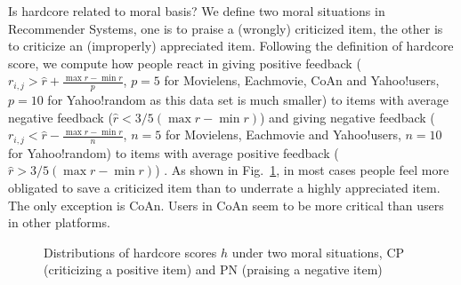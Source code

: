 \documentclass[sigconf]{acmart}
\begin{document}
Is hardcore related to moral basis? We define two moral situations in Recommender Systems, one is to praise a (wrongly) criticized item, the other is to criticize an (improperly) appreciated item. Following the definition of hardcore score, we compute how people react in giving positive feedback ($r_{i,j}>\hat{r}+\frac{\max{r}-\min{r}}{p}$, $p=5$ for Movielens, Eachmovie, CoAn and Yahoo!users, $p=10$ for Yahoo!random as this data set is much smaller) to items with average negative feedback ($\hat{r}< 3/5 (\max{r}-\min{r})$) and giving negative feedback ($r_{i,j}<\hat{r}-\frac{\max{r}-\min{r}}{n}$, $n=5$ for Movielens, Eachmovie and Yahoo!users, $n=10$ for Yahoo!random) to items with average positive feedback ($\hat{r}>3/5 (\max{r}-\min{r})$) . As shown in Fig.~\ref{fig:moralbasis}, in most cases people feel more obligated to save a criticized item than to underrate a highly appreciated item. The only exception is CoAn. Users in CoAn seem to be more critical than users in other platforms.

\begin{figure}[htbp]
\centering
\noindent
{}
\hspace{-0.5cm}
\hspace{-0.5cm}
\hspace{-0.5cm}
\hspace{-0.5cm}
\caption{Distributions of hardcore scores $h$ under two moral situations, CP (criticizing a positive item) and PN (praising a negative item)}
\label{fig:moralbasis}
\end{figure}
\end{document}

